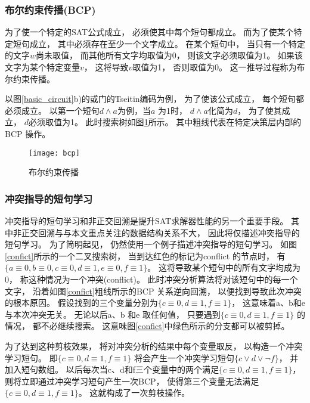 \subsubsection{布尔约束传播(BCP)}
为了使一个特定的SAT公式成立，
必须使其中每个短句都成立。
而为了使某个特定短句成立，
其中必须存在至少一个文字成立。
在某个短句中，
当只有一个特定的文字$w$尚未取值，
而其他所有文字均取值为0，
则该文字必须取值为1。
如果该文字为某个特定变量$v$，
这将导致$v$取值为1，
否则取值为0。
这一推导过程称为布尔约束传播。

以图\ref{basic_circuit}b)的或门的Tseitin编码为例，
为了使该公式成立，
每个短句都必须成立。
以第一个短句$d \wedge a$为例，当$a$ 为1时，
$d \wedge a$化简为$d$，
为了使其成立，
$d$必须取值为1。 
此时搜索树如图\ref{BCP}所示。
其中粗线代表在特定决策层内部的BCP 操作。

\begin{figure}[t] %
  \centering
  \texttt{[image: bcp]}
  \caption{布尔约束传播}
  \label{BCP}
\end{figure}

\subsubsection{冲突指导的短句学习}
冲突指导的短句学习和非正交回溯是提升SAT求解器性能的另一个重要手段。
其中非正交回溯与与本文重点关注的数据结构关系不大，
因此将仅描述冲突指导的短句学习。
为了简明起见，
仍然使用一个例子描述冲突指导的短句学习。
如图\ref{confict}所示的一个二叉搜索树，
当到达红色的标记为conflict 的节点时，
有$\{a \equiv 0,b \equiv 0, c \equiv 0,d \equiv1,e \equiv 0,f \equiv1\}$。
这将导致某个短句中的所有文字均成为0，
称这种情况为一个冲突(conflict)。 
此时冲突分析算法将对该短句中的每一个文字，
沿着如图\ref{confict}粗线所示的BCP 关系逆向回溯，
以便找到导致此次冲突的根本原因。
假设找到的三个变量分别为$\{c \equiv 0,d \equiv 1,f \equiv 1\}$，
这意味着a、b和e与本次冲突无关。
无论以后a、b 和e 取任何值，
只要遇到$\{c \equiv 0,d \equiv 1,f \equiv 1\}$ 的情况，
都不必继续搜索。
这意味图\ref{confict}中绿色所示的分支都可以被剪掉。

为了达到这种剪枝效果，
将对冲突分析的结果中每个变量取反，
以构造一个冲突学习短句。
即$\{c \equiv 0, d \equiv 1, f \equiv 1\}$ 将会产生一个冲突学习短句$\{c\vee d \vee \neg f\}$，
并加入短句数组。
以后每次当c、d和f三个变量中的两个满足$\{c \equiv 0, d \equiv 1, f \equiv 1\}$，
则将立即通过冲突学习短句产生一次BCP，
使得第三个变量无法满足$\{c \equiv 0,d \equiv 1,f \equiv 1\}$。 
这就构成了一次剪枝操作。


